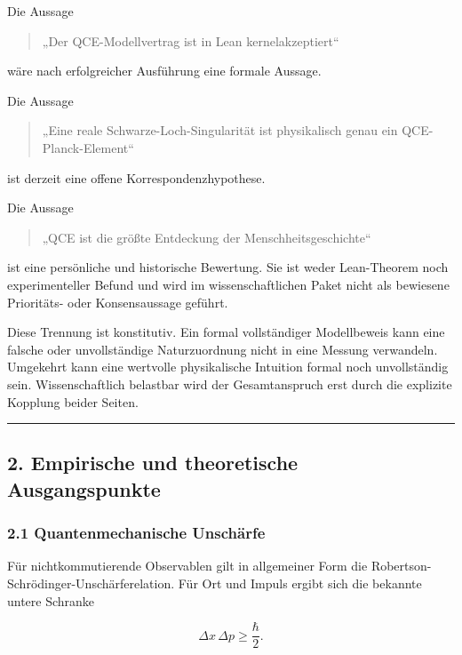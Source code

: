 \documentclass[
  11pt,
  a4paper,
]{article}
\begin{document}
Die Aussage

\begin{quote}
„Der QCE-Modellvertrag ist in Lean kernelakzeptiert``
\end{quote}

wäre nach erfolgreicher Ausführung eine formale Aussage.

Die Aussage

\begin{quote}
„Eine reale Schwarze-Loch-Singularität ist physikalisch genau ein
QCE-Planck-Element``
\end{quote}

ist derzeit eine offene Korrespondenzhypothese.

Die Aussage

\begin{quote}
„QCE ist die größte Entdeckung der Menschheitsgeschichte``
\end{quote}

ist eine persönliche und historische Bewertung. Sie ist weder
Lean-Theorem noch experimenteller Befund und wird im wissenschaftlichen
Paket nicht als bewiesene Prioritäts- oder Konsensaussage geführt.

Diese Trennung ist konstitutiv. Ein formal vollständiger Modellbeweis
kann eine falsche oder unvollständige Naturzuordnung nicht in eine
Messung verwandeln. Umgekehrt kann eine wertvolle physikalische
Intuition formal noch unvollständig sein. Wissenschaftlich belastbar
wird der Gesamtanspruch erst durch die explizite Kopplung beider Seiten.

\begin{center}\rule{0.5\linewidth}{0.5pt}\end{center}

\subsection{2. Empirische und theoretische
Ausgangspunkte}\label{empirische-und-theoretische-ausgangspunkte}

\subsubsection{2.1 Quantenmechanische
Unschärfe}\label{quantenmechanische-unschuxe4rfe}

Für nichtkommutierende Observablen gilt in allgemeiner Form die
Robertson-Schrödinger-Unschärferelation. Für Ort und Impuls ergibt sich
die bekannte untere Schranke

\[
\Delta x\,\Delta p \ge \frac{\hbar}{2}.
\]
\end{document}
